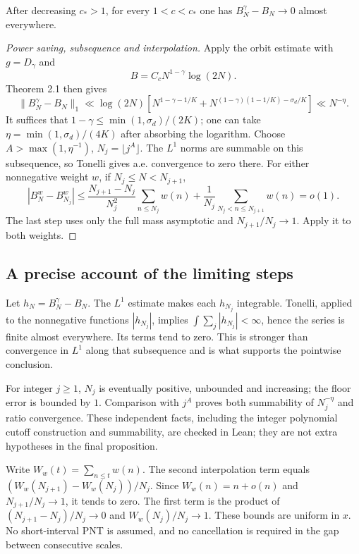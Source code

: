 \begin{proposition}\label{p:pointwise-comparison}
\leanok
After decreasing $c_*>1$, for every $1<c<c_*$ one has
$B_N^\gamma-B_N\to0$ almost everywhere.
\end{proposition}
\begin{proof}[Power saving, subsequence and interpolation]
\leanok
Apply the orbit estimate with $g=D_\gamma$ and
\[B=C_cN^{1-\gamma}\log(2N).\]
Theorem 2.1 then gives
\[
 \|B_N^\gamma-B_N\|_1\ll\log(2N)
 \left[N^{1-\gamma-1/K}
 +N^{(1-\gamma)(1-1/K)-\sigma_d/K}\right]\ll N^{-\eta}.
\]
It suffices that $1-\gamma\leq\min(1,\sigma_d)/(2K)$; one can take $\eta=\min(1,\sigma_d)/(4K)$ after absorbing the logarithm. Choose $A>\max(1,\eta^{-1})$, $N_j=\lfloor j^A\rfloor$. The $L^1$ norms are summable on this subsequence, so Tonelli gives a.e. convergence to zero there. For either nonnegative weight $w$, if $N_j\leq N<N_{j+1}$,
\[
 |B_N^w-B_{N_j}^w|
 \leq\frac{N_{j+1}-N_j}{N_j^2}\sum_{n\leq N_j}w(n)
 +\frac1{N_j}\sum_{N_j<n\leq N_{j+1}}w(n)=o(1).
\]
The last step uses only the full mass asymptotic and $N_{j+1}/N_j\to1$. Apply it to both weights.
\end{proof}
\ifDetailed
\subsection*{A precise account of the limiting steps}
Let $h_N=B_N^\gamma-B_N$. The $L^1$ estimate makes each $h_{N_j}$ integrable. Tonelli, applied to the nonnegative functions $|h_{N_j}|$, implies $\int\sum_j|h_{N_j}|<\infty$, hence the series is finite almost everywhere. Its terms tend to zero. This is stronger than convergence in $L^1$ along that subsequence and is what supports the pointwise conclusion.

For integer $j\geq1$, $N_j$ is eventually positive, unbounded and increasing; the floor error is bounded by $1$. Comparison with $j^A$ proves both summability of $N_j^{-\eta}$ and ratio convergence. These independent facts, including the integer polynomial cutoff construction and summability, are checked in Lean; they are not extra hypotheses in the final proposition.

Write $W_w(t)=\sum_{n\leq t}w(n)$. The second interpolation term equals $(W_w(N_{j+1})-W_w(N_j))/N_j$. Since $W_w(n)=n+o(n)$ and $N_{j+1}/N_j\to1$, it tends to zero. The first term is the product of $(N_{j+1}-N_j)/N_j\to0$ and $W_w(N_j)/N_j\to1$. These bounds are uniform in $x$. No short-interval PNT is assumed, and no cancellation is required in the gap between consecutive scales.

